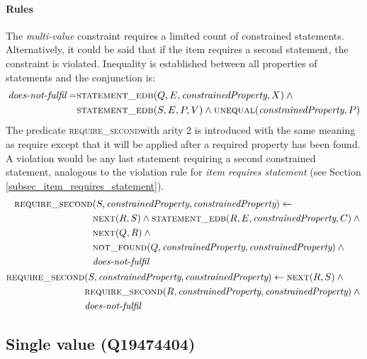 \documentclass[hyperref,bachelorofscience,fleqn]{cgvpub}
\begin{document}
\paragraph{Rules}
The \emph{multi-value} constraint requires a limited count of constrained statements. Alternatively, it could be said that if the item requires a second statement, the constraint is violated. Inequality is established between all properties of statements and the conjunction is:
\begin{equation}
\begin{split}
\emph{does-not-fulfil} = &\textsc{statement\_edb}(Q, E, \emph{constrainedProperty}, X) \wedge{} \\
&\textsc{statement\_edb}(S, E, P, V) \wedge \textsc{unequal}(\emph{constrainedProperty}, P)
\end{split}
\end{equation}
The predicate \textsc{require\_second}with arity 2 is introduced with the same meaning as require except that it will be applied after a required property has been found. A violation would be any last statement requiring a second constrained statement, analogous to the violation rule for \emph{item requires statement} (see Section \ref{subsec_item_requires_statement}).
\begin{align}
\begin{split}
\textsc{require\_second}&(S, \emph{constrainedProperty}, \emph{constrainedProperty}) \leftarrow \\
&\textsc{next}(R, S) \wedge \textsc{statement\_edb}(R, E, \emph{constrainedProperty}, C) \wedge{} \\
&\textsc{next}(Q, R) \wedge{} \\
&\textsc{not\_found}(Q, \emph{constrainedProperty}, \emph{constrainedProperty})  \wedge{} \\
&\emph{does-not-fulfil}
\end{split}\\
\begin{split}
\textsc{require\_second}&(S, \emph{constrainedProperty}, \emph{constrainedProperty}) \leftarrow \textsc{next}(R, S) \wedge{} \\
&\textsc{require\_second}(R, \emph{constrainedProperty}, \emph{constrainedProperty}) \wedge{} \\
&\emph{does-not-fulfil}
\end{split}
\end{align}

\subsection{Single value (Q19474404)}\label{subsec_single_value}
\end{document}
